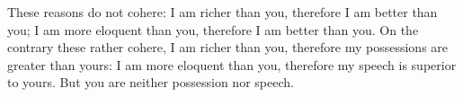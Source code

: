 These reasons do not  cohere: I am richer than you, therefore  I am better than
you;  I am  more eloquent  than you,  therefore I  am better  than you.  On the
contrary these  rather cohere, I am  richer than you, therefore  my possessions
are greater  than yours: I  am more eloquent than  you, therefore my  speech is
superior to yours. But you are neither possession nor speech.
